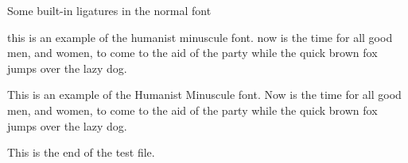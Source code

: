 \documentclass{article}
\newcommand{\sentence}{%
this is an example of the humanist minuscule font. now is the time for all good
men, and women, to come to the aid of the party while the quick brown fox
jumps over the lazy dog.}
\newcommand{\Sentence}{%
This is an example of the Humanist Minuscule font. Now is the time for all good
men, and women, to come to the aid of the party while the quick brown fox
jumps over the lazy dog.}
\newcommand{\esses}{sa sb sc sd se sf sg sh si sj sk sl sm 
                    sn so sp sq sr ss st su sv sw sx sy sz}
\newcommand{\exes}{xa xb xc xd xe xf xg xh xi xj xk xl xm 
                  xn xo xp xq xr xs xt xu xv xw xx xy xz}
\newcommand{\jays}{aj bj cj dj ej fj gj hj ij jj kj lj mj 
                   nj oj pj qj rj sj tj uj vj wj xj yj zj}
\newcommand{\dees}{ad bd cd dd ed fd gd hd id jd kd ld md 
                   nd od pd qd rd sd td ud vd wd xd yd zd}
\newcommand{\ares}{ra rb rc rd re rf rg rh ri rj rk rl rm 
                   rn ro rp rq rr rs rt ru rv rw rx ry rz}
\newcommand{\Esses}{SA SB SC SD SE SF SG SH SI SJ SK SL SM 
                    SN SO SP SQ SR SS ST SU SV SW SX SY SZ}
\newcommand{\Exes}{XA XB XC XD XE XF XG XH XI XJ XK XL XM 
                  XN XO XP XQ XR XS XT XU XV XW XX XY XZ}
\newcommand{\Jays}{AJ BJ CJ DJ EJ FJ GJ HJ IJ JJ KJ LJ MJ 
                   NJ OJ PJ QJ RJ SJ TJ UJ VJ WJ XJ YJ ZJ}
\newcommand{\Dees}{AD BD CD DD ED FD GD HD ID JD KD LD MD 
                   ND OD PD QD RD SD TD UD VD WD XD YD ZD}
\newcommand{\Ares}{RA RB RC RD RE RF RG RH RI RJ RK RL RM 
                   RN RO RP RQ RR RS RT RU RV RW RX RY RZ}
\begin{document}
\begin{center}
    Some built-in ligatures in the normal font \\
\end{center}


{
\hminfamily 
\sentence{}

\Sentence{}
}
    
    This is the end of the test file.
\end{document}
